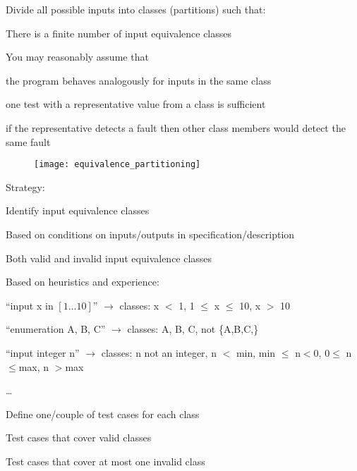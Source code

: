 Divide all possible inputs into classes (partitions) such that:
\begin{itemize*}
	\item There is a finite number of input equivalence classes
	\item You may reasonably assume that
	\begin{itemize*}
		\item the program behaves analogously for inputs in the same class
		\item one test with a representative value from a class is sufficient
		\item if the representative detects a fault
		then other class members would detect the same fault
	\end{itemize*}
\end{itemize*}

\begin{figure}[h!]
	\centering
	\texttt{[image: equivalence\_partitioning]}
\end{figure}

Strategy:
\begin{itemize*}
	\item Identify input equivalence classes
	\begin{itemize*}
		\item Based on conditions on inputs/outputs in specification/description
		\item Both valid and invalid input equivalence classes
		\item Based on heuristics and experience:
		\begin{itemize*}
			\item ``input x in $[1\ldots10]$''
			$\rightarrow$ classes: x $<$ 1, 1 $\leq$ x $\leq$ 10, x $>$ 10
			\item ``enumeration A, B, C'' $\rightarrow$ classes: A, B, C, not \{A,B,C,\}
			\item ``input integer n''
			$\rightarrow$ classes: n not an integer,
			n $<$ min, min $\leq$ n$<$0, 0$\leq$ n $\leq$max, n $>$max
			\item\ldots
		\end{itemize*}
	\end{itemize*}
	\item Define one/couple of test cases for each class
	\begin{itemize*}
		\item Test cases that cover valid classes
		\item Test cases that cover at most one invalid class
	\end{itemize*}
\end{itemize*}

